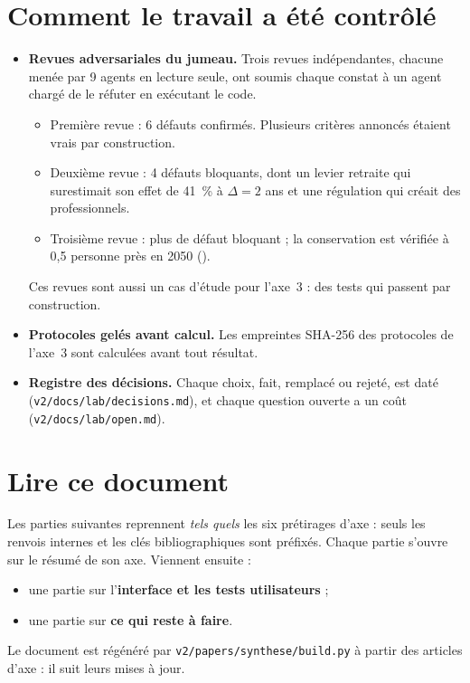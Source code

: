 \section{Comment le travail a été contrôlé}
\begin{itemize}
  \item \textbf{Revues adversariales du jumeau.} Trois revues indépendantes, chacune menée par
        9 agents en lecture seule, ont soumis chaque constat à un agent chargé de le réfuter en
        exécutant le code.
        \begin{itemize}
          \item Première revue : 6 défauts confirmés. Plusieurs critères annoncés étaient vrais
                par construction.
          \item Deuxième revue : 4 défauts bloquants, dont un levier retraite qui surestimait
                son effet de 41~\% à $\Delta = 2$ ans et une régulation qui créait des
                professionnels.
          \item Troisième revue : plus de défaut bloquant ; la conservation est vérifiée à
                0,5 personne près en 2050 (\mesure).
        \end{itemize}
        Ces revues sont aussi un cas d'étude pour l'axe~3 : des tests qui passent par
        construction.
  \item \textbf{Protocoles gelés avant calcul.} Les empreintes SHA-256 des protocoles de
        l'axe~3 sont calculées avant tout résultat.
  \item \textbf{Registre des décisions.} Chaque choix, fait, remplacé ou rejeté, est daté
        (\texttt{v2/docs/lab/decisions.md}), et chaque question ouverte a un coût
        (\texttt{v2/docs/lab/open.md}).
\end{itemize}

\section{Lire ce document}
Les parties suivantes reprennent \emph{tels quels} les six prétirages d'axe : seuls les renvois
internes et les clés bibliographiques sont préfixés. Chaque partie s'ouvre sur le résumé de son
axe. Viennent ensuite :
\begin{itemize}
  \item une partie sur l'\textbf{interface et les tests utilisateurs} ;
  \item une partie sur \textbf{ce qui reste à faire}.
\end{itemize}
Le document est régénéré par \texttt{v2/papers/synthese/build.py} à partir des articles
d'axe : il suit leurs mises à jour.

